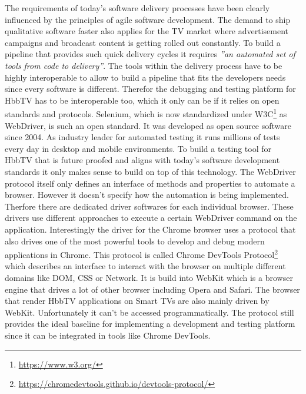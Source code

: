 The requirements of today's software delivery processes have been clearly influenced by the principles of agile software development. The demand to ship qualitative software faster also applies for the TV market where advertisement campaigns and broadcast content is getting rolled out constantly. To build a pipeline that provides such quick delivery cycles it requires \textit{''an automated set of tools from code to delivery''}\cite{Lehtonen2015DefiningMF}. The tools within the delivery process have to be highly interoperable to allow to build a pipeline that fits the developers needs since every software is different. Therefor the debugging and testing platform for HbbTV has to be interoperable too, which it only can be if it relies on open standards and protocols. Selenium, which is now standardized under W3C\footnote{\url{https://www.w3.org/}} as WebDriver, is such an open standard. It was developed as open source software since 2004. As industry leader for automated testing it runs millions of tests every day in desktop and mobile environments. To build a testing tool for HbbTV that is future proofed and aligns with today's software development standards it only makes sense to build on top of this technology. The WebDriver protocol itself only defines an interface of methods and properties to automate a browser. However it doesn't specify how the automation is being implemented. Therfore there are dedicated driver softwares for each individual browser. These drivers use different approaches to execute a certain WebDriver command on the application. Interestingly the driver for the Chrome browser uses a protocol that also drives one of the most powerful tools to develop and debug modern applications in Chrome. This protocol is called Chrome DevTools Protocol\footnote{\url{https://chromedevtools.github.io/devtools-protocol/}} which describes an interface to interact with the browser on multiple different domains like DOM, CSS or Network. It is build into WebKit which is a browser engine that drives a lot of other browser including Opera and Safari. The browser that render HbbTV applications on Smart TVs are also mainly driven by WebKit. Unfortunately it can't be accessed programmatically. The protocol still provides the ideal baseline for implementing a development and testing platform since it can be integrated in tools like Chrome DevTools.

